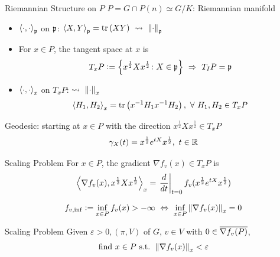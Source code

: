 \documentclass{beamer}
\begin{document}
	\begin{frame}{Riemannian Structure on $P$}
		$P = G \cap P(n) \simeq G/K$: Riemannian manifold
		\vspace{1em}
		\begin{itemize}
			\item $\left\langle \cdot,\cdot \right\rangle_{\mathfrak{p}}$ on $\mathfrak{p}$: $\left\langle X,Y \right\rangle_{\mathfrak{p}} = \operatorname{tr}\left(XY\right)~\leadsto~\left\lVert\cdot\right\lVert_{\mathfrak{p}}$
			\vspace{0.5em}
			\item For $x \in P$, the tangent space at $x$ is
			\begin{equation*}
				T_xP \vcentcolon= \left\{x^{\frac{1}{2}}Xx^{\frac{1}{2}} \colon X \in \mathfrak{p}\right\}~\Rightarrow~ T_IP=\mathfrak{p}
			\end{equation*}
			\item $\left\langle \cdot,\cdot \right\rangle_{x}$ on $T_xP$: $\leadsto~\left\lVert\cdot\right\lVert_{x}$
			\begin{equation*}
				\left\langle H_1,H_2 \right\rangle_{x} = \operatorname{tr}\left(x^{-1}H_1x^{-1}H_2\right),~\forall~H_1,H_2 \in T_xP
			\end{equation*}
		\end{itemize}
		Geodesic: starting at $x \in P$ with the direction $x^{\frac{1}{2}}Xx^{\frac{1}{2}} \in T_xP$
			\begin{equation*}
				\gamma_X(t) = x^{\frac{1}{2}}e^{tX}x^{\frac{1}{2}},~t \in \mathbb{R}
			\end{equation*}
	\end{frame}

	\begin{frame}{Scaling Problem}
		For $x \in P$, the gradient $\nabla f_v(x) \in T_xP$ is
		\begin{equation*}
			\left\langle \nabla f_v(x),x^{\frac{1}{2}}Xx^{\frac{1}{2}} \right\rangle_x = \left.\frac{d}{dt}\right\lvert_{t=0}f_v(x^{\frac{1}{2}}e^{tX}x^{\frac{1}{2}})
		\end{equation*}
		\vspace{-1em}
		\begin{thm}
			\begin{equation*}
				f_{v,\inf}\vcentcolon=\inf_{x\in P} f_v(x) > -\infty  ~\Leftrightarrow~  \inf_{x \in P} \left\lVert\nabla f_v(x)\right\lVert_{x} = 0
			\end{equation*}
		\end{thm}
		\begin{block}{Scaling Problem}
			Given $\varepsilon > 0,(\pi,V)$ of $G$, $v \in V$ with $0 \in \overline{\nabla f_v(P)}$, 
			\begin{equation*}
				\text{find } x \in P \text{ s.t. }\norm{\nabla f_v(x)}_{x} < \varepsilon
				\vspace{0.5em}
			\end{equation*}
		\end{block}
	\end{frame}
\end{document}
